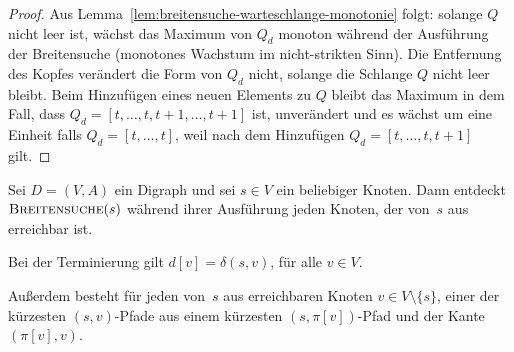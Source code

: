 \begin{proof}
Aus Lemma~\ref{lem:breitensuche-warteschlange-monotonie} folgt: solange $Q$ nicht leer ist, wächst das Maximum von $Q_d$ monoton während der Ausführung der Breitensuche (monotones Wachstum im nicht-strikten Sinn). Die Entfernung des Kopfes verändert die Form von $Q_d$ nicht, solange die Schlange $Q$ nicht leer bleibt. Beim Hinzufügen eines neuen Elements zu $Q$ bleibt das Maximum in dem Fall, dass $Q_d=[t,\ldots,t,t+1,\ldots,t+1]$ ist, unverändert und es wächst um eine Einheit falls $Q_d=[t,\ldots,t]$, weil nach dem Hinzufügen $Q_d = [t,\ldots,t,t+1]$ gilt.
\end{proof}



\begin{thm}
\label{thm:breitensuche}
Sei $D=(V,A)$ ein Digraph und sei $s \in V$ ein beliebiger Knoten.
Dann entdeckt $\mathop{\text{\textsc{Breitensuche}}}(s)$ während ihrer Ausführung jeden Knoten, der von~$s$ aus erreichbar ist. 

Bei der Terminierung gilt $d[v] = \delta(s,v)$, für alle $v \in V$.

Außerdem besteht für jeden von~$s$ aus erreichbaren Knoten $v \in V \setminus \{ s\}$, einer der kürzesten $(s,v)$-Pfade aus einem kürzesten $(s,\pi[v])$-Pfad und der Kante $(\pi[v],v)$.
\end{thm}

